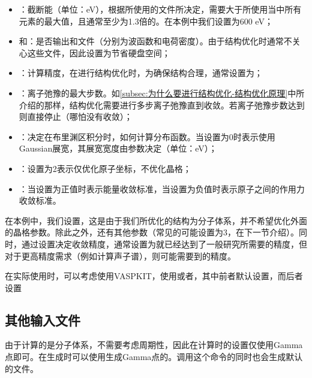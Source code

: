 \begin{itemize}
    \item {}：截断能（单位：eV），根据所使用的文件所决定，需要大于所使用当中所有元素的最大值，且通常至少为1.3倍的。在本例中我们设置为600 eV；
    \item {}和：是否输出和文件（分别为波函数和电荷密度）。由于结构优化时通常不关心这些文件，因此设置为节省硬盘空间；
    \item {}：计算精度，在进行结构优化时，为确保结构合理，通常设置为；
    \item {}：离子弛豫的最大步数。如\ref{subsec:为什么要进行结构优化-结构优化原理}中所介绍的那样，结构优化需要进行多步离子弛豫直到收敛。若离子弛豫步数达到则直接停止（哪怕没有收敛）；
    \item {}：决定在布里渊区积分时，如何计算分布函数。当设置为0时表示使用Gaussian展宽，其展宽宽度由参数决定（单位：eV）；
    \item {}：设置为2表示仅优化原子坐标，不优化晶格；
    \item {}：当设置为正值时表示能量收敛标准，当设置为负值时表示原子之间的作用力收敛标准。
\end{itemize}

在本例中，我们设置，这是由于我们所优化的结构为分子体系，并不希望优化外面的晶格参数。除此之外，还有其他参数（常见的可能设置为3，在下一节介绍）。同时，通过设置决定收敛精度，通常设置为就已经达到了一般研究所需要的精度，但对于更高精度需求（例如计算声子谱），则可能需要到的精度。

在实际使用时，可以考虑使用VASPKIT，使用或者，其中前者默认设置，而后者设置

\subsection{其他输入文件}\label{subsec:对坐标进行优化ISIF=2-其他输入文件}

由于计算的是分子体系，不需要考虑周期性，因此在计算时的设置仅使用Gamma点即可。在生成时可以使用生成Gamma点的。调用这个命令的同时也会生成默认的文件。


